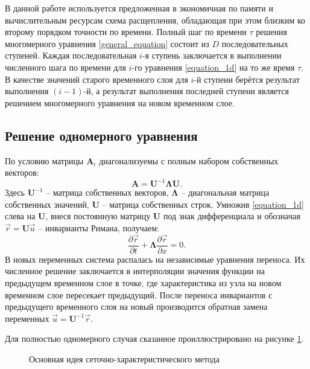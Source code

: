 В данной работе используется предложенная в \cite{chelnokov}
экономичная по памяти и вычислительным ресурсам схема расщепления, 
обладающая при этом близким ко второму порядком точности по времени.
Полный шаг по времени $\tau$ решения многомерного уравнения \eqref{general_equation} 
состоит из $D$ последовательных ступеней. 
Каждая последовательная $i$-я ступень заключается в выполнении численного шага по времени
для $i$-го уравнения \eqref{equation_1d} на то же время $\tau$. 
В качестве значений старого временного слоя для $i$-й ступени 
берётся результат выполнения $(i-1)$-й, 
а результат выполнения последней ступени является решением 
многомерного уравнения на новом временном слое. 


\subsection{Решение одномерного уравнения}
По условию матрицы $\mathbf{A}_i$ диагонализуемы с полным набором собственных векторов:
\begin{equation}
	\label{diagonal_view}
	\mathbf{A} = \mathbf{U}^{-1}\mathbf{\Lambda}\mathbf{U}.
\end{equation}
Здесь $\mathbf{U}^{-1}$ -- матрица собственных векторов, 
$\mathbf{\Lambda}$ -- диагональная матрица собственных значений,
$\mathbf{U}$ -- матрица собственных строк.
Умножив \eqref{equation_1d} слева на $\mathbf{U}$, 
внеся постоянную матрицу $\mathbf{U}$ под знак дифференциала
и обозначая $\vec{r} = \mathbf{U}\vec{u}$ -- инварианты Римана, получаем:
\begin{equation}
	\label{in_riemann_invariants}
	\frac{\partial\vec{r}}{\partial{t}}+\mathbf{\Lambda}\frac{\partial\vec{r}}{\partial{x}} = 0.
\end{equation}
В новых переменных система распалась на независимые уравнения переноса.
Их численное решение заключается в интерполяции значения функции
на предыдущем временном слое в точке, где характеристика из узла 
на новом временном слое пересекает предыдущий. 
После переноса инвариантов с предыдущего временного слоя на новый
производится обратная замена переменных $\vec{u} = \mathbf{U}^{-1}\vec{r}$.

Для полностью одномерного случая 
сказанное проиллюстрировано на рисунке \ref{pic:gcm-idea}.
\begin{figure}[H]
	\caption{Основная идея сеточно-характеристического метода}
	\label{pic:gcm-idea}
\end{figure}

